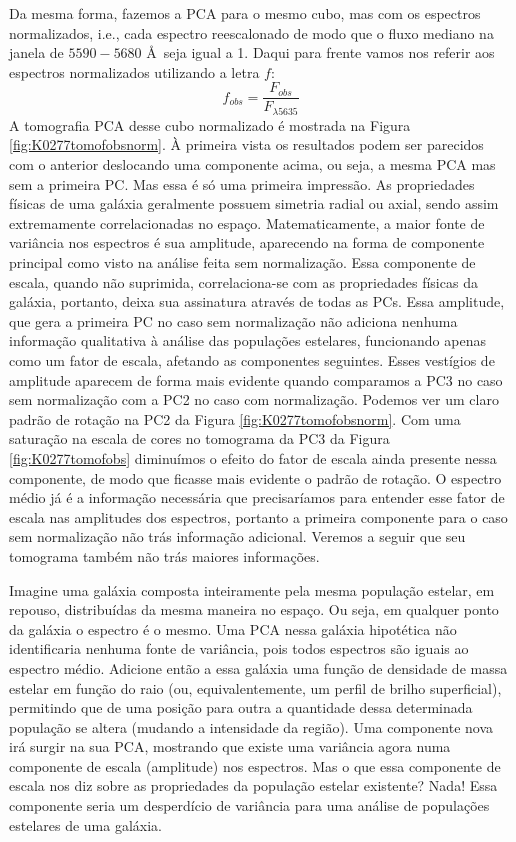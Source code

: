 Da mesma forma, fazemos a PCA para o mesmo cubo, mas com os espectros normalizados, i.e., cada espectro reescalonado de
modo que o fluxo mediano na janela de $5590-5680$ \AA\ seja igual a 1. Daqui para frente vamos nos referir aos espectros
normalizados utilizando a letra $f$:
\begin{equation}
f_{obs} = \dfrac{F_{obs}}{F_{\lambda5635}}
\end{equation} 
\noindent A tomografia PCA desse cubo normalizado é mostrada na Figura \ref{fig:K0277tomofobsnorm}. À primeira vista os
resultados podem ser parecidos com o anterior deslocando uma componente acima, ou seja, a mesma PCA mas sem a primeira
PC. Mas essa é só uma primeira impressão. As propriedades físicas de uma galáxia geralmente possuem simetria radial ou
axial, sendo assim extremamente correlacionadas no espaço. Matematicamente, a maior fonte de variância nos espectros é
sua amplitude, aparecendo na forma de componente principal como visto na análise feita sem normalização. Essa componente
de escala, quando não suprimida, correlaciona-se com as propriedades físicas da galáxia, portanto, deixa sua assinatura
através de todas as PCs. Essa amplitude, que gera a primeira PC no caso sem normalização não adiciona nenhuma informação
qualitativa à análise das populações estelares, funcionando apenas como um fator de escala, afetando as componentes
seguintes. Esses vestígios de amplitude aparecem de forma mais evidente quando comparamos a PC3 no caso sem normalização
com a PC2 no caso com normalização. Podemos ver um claro padrão de rotação na PC2 da Figura \ref{fig:K0277tomofobsnorm}.
Com uma saturação na escala de cores no tomograma da PC3 da Figura \ref{fig:K0277tomofobs} diminuímos o efeito do fator
de escala ainda presente nessa componente, de modo que ficasse mais evidente o padrão de rotação. O espectro médio já é
a informação necessária que precisaríamos para entender esse fator de escala nas amplitudes dos espectros, portanto a
primeira componente para o caso sem normalização não trás informação adicional. Veremos a seguir que seu tomograma
também não trás maiores informações.

Imagine uma galáxia composta inteiramente pela mesma população estelar, em repouso, distribuídas da mesma maneira no
espaço. Ou seja, em qualquer ponto da galáxia o espectro é o mesmo. Uma PCA nessa galáxia hipotética não identificaria
nenhuma fonte de variância, pois todos espectros são iguais ao espectro médio. Adicione então a essa galáxia uma função
de densidade de massa estelar em função do raio (ou, equivalentemente, um perfil de brilho superficial), permitindo que
de uma posição para outra a quantidade dessa determinada população se altera (mudando a intensidade da região). Uma
componente nova irá surgir na sua PCA, mostrando que existe uma variância agora numa componente de escala (amplitude)
nos espectros. Mas o que essa componente de escala nos diz sobre as propriedades da população estelar existente? Nada!
Essa componente seria um desperdício de variância para uma análise de populações estelares de uma galáxia.

